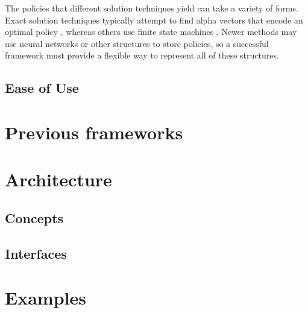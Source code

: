 The policies that different solution techniques yield can take a variety of forms.
Exact solution techniques typically attempt to find alpha vectors that encode an optimal policy \cite{kaelbling1998planning,kurniawati2008sarsop}, whereas others use finite state machines \cite{bai2010mcvi}.
Newer methods may use neural networks \cite{karkus2017qmdp} or other structures to store policies, so a successful framework must provide a flexible way to represent all of these structures.


\subsection{Ease of Use}


\section{Previous frameworks}

\section{Architecture}

\subsection{Concepts}

\subsection{Interfaces}

\section{Examples}
